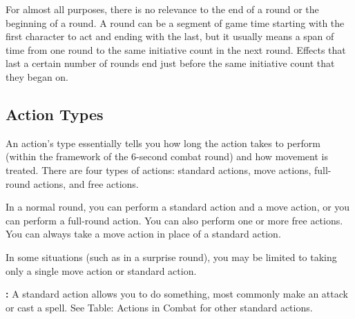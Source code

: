 For almost all purposes, there is no relevance to the end of a round or the beginning of a round. A round can be a segment of game time starting with the first character to act and ending with the last, but it usually means a span of time from one round to the same initiative count in the next round. Effects that last a certain number of rounds end just before the same initiative count that they began on.

\subsection{Action Types}

An action's type essentially tells you how long the action takes to perform (within the framework of the 6-second combat round) and how movement is treated. There are four types of actions: standard actions, move actions, full-round actions, and free actions.

In a normal round, you can perform a standard action and a move action, or you can perform a full-round action. You can also perform one or more free actions. You can always take a move action in place of a standard action.

In some situations (such as in a surprise round), you may be limited to taking only a single move action or standard action.

\textbf{:} A standard action allows you to do something, most commonly make an attack or cast a spell. See Table: Actions in Combat for other standard actions.

